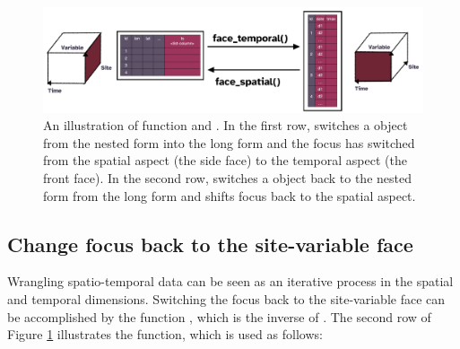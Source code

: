 \documentclass[
  shortnames]{jss}
\begin{document}
\begin{CodeChunk}
\begin{figure}

{\centering \includegraphics[width=1\linewidth]{../figures/diagram-keynotes/diagram-keynotes.002} 

}

\caption{An illustration of function  and . In the first row,  switches a  object from the nested form into the long form and the focus has switched from the spatial aspect (the side face) to the temporal aspect (the front face). In the second row,  switches a  object back to the nested form from the long form and shifts focus back to the spatial aspect.}\label{fig:face}
\end{figure}
\end{CodeChunk}

\hypertarget{change-focus-back-to-the-site-variable-face}{%
\subsection{Change focus back to the site-variable face}\label{change-focus-back-to-the-site-variable-face}}

Wrangling spatio-temporal data can be seen as an iterative process in the spatial and temporal dimensions. Switching the focus back to the site-variable face can be accomplished by the function , which is the inverse of . The second row of Figure \ref{fig:face} illustrates the function, which is used as follows:
\end{document}
